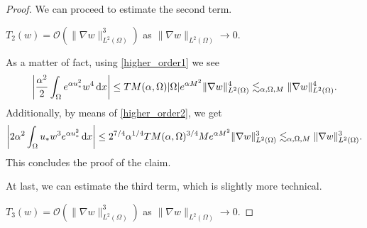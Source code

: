 \documentclass[10pt,a4paper]{amsart}
\newcommand{\ud}{\,\mathrm{d}}
\begin{document}
\begin{proof}
    We can proceed to estimate the second term. 
    
     $T_2(w)=\mathcal{O}(\|\nabla w\|^3_{L^2(\Omega)})$ as $\|\nabla w\|_{L^2(\Omega)}\to0$.

    \noindent
    As a matter of fact, using \eqref{higher_order1} we see 
    \begin{equation} \label{higher_order8} 
    \left | \frac{\alpha^2}{2} \int_\Omega e^{\alpha u_*^2} w^4 \ud x \right | \leq 
    {\rm TM}(\alpha,\Omega) |\Omega |e^{\alpha M^2} \| \nabla w \|_{L^2(\Omega)}^4 \lesssim_{\alpha, \Omega, M}\| \nabla w\|_{L^2(\Omega)}^4.\end{equation} 
    Additionally, by means of \eqref{higher_order2}, we get
    \begin{equation} \label{higher_order9} 
    \left | 2\alpha^2 \int_\Omega u_*w^3 e^{\alpha u_*^2} \ud x \right | \leq 
    2^{7/4} \alpha ^{1/4} {\rm TM}(\alpha,\Omega)^{3/4} M e^{\alpha M^2} 
    \| \nabla w\|_{L^2(\Omega)}^3\lesssim_{\alpha, \Omega, M}\| \nabla w\|_{L^2(\Omega)}^3.\end{equation}
    This concludes the proof of the claim. 


    At last, we can estimate the third term, which is slightly more technical.
    
     $T_3(w)=\mathcal{O}(\|\nabla w\|^3_{L^2(\Omega)})$ as $\|\nabla w\|_{L^2(\Omega)}\to0$.


\end{proof}
\end{document}
